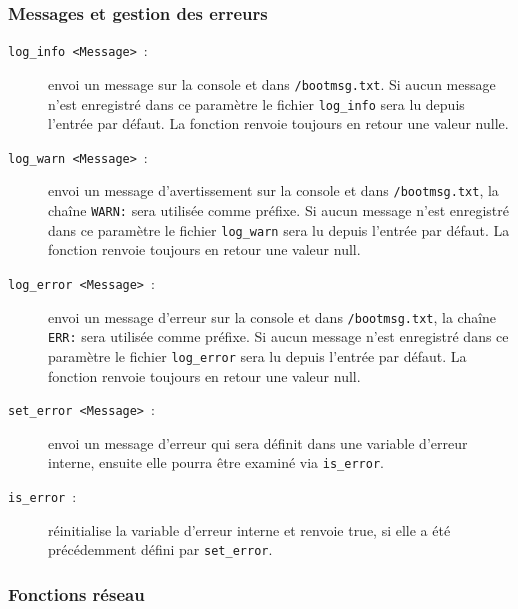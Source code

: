 \subsubsection{Messages et gestion des erreurs}

\begin{description}

\item[\texttt{log\_info <Message>}~:] envoi un message sur la console
et dans \texttt{/bootmsg.txt}. Si aucun message n'est enregistré dans ce paramètre
le fichier \texttt{log\_info} sera lu depuis l'entrée par défaut. La fonction renvoie
toujours en retour une valeur nulle.

\item[\texttt{log\_warn <Message>}~:] envoi un message d'avertissement sur la console
et dans \texttt{/bootmsg.txt}, la chaîne \texttt{WARN:} sera utilisée comme préfixe.
Si aucun message n'est enregistré dans ce paramètre le fichier \texttt{log\_warn}
sera lu depuis l'entrée par défaut. La fonction renvoie toujours en retour une valeur null.

\item[\texttt{log\_error <Message>}~:] envoi un message d'erreur sur la console
et dans \texttt{/bootmsg.txt}, la chaîne \texttt{ERR:} sera utilisée comme préfixe.
Si aucun message n'est enregistré dans ce paramètre le fichier \texttt{log\_error}
sera lu depuis l'entrée par défaut. La fonction renvoie toujours en retour une valeur null.

\item[\texttt{set\_error <Message>}~:] envoi un message d'erreur qui sera définit dans
  une variable d'erreur interne, ensuite elle pourra être examiné via \texttt{is\_error}.

\item[\texttt{is\_error}~:] réinitialise la variable d'erreur interne et renvoie true,
si elle a été précédemment défini par \texttt{set\_error}.

\end{description}


\subsubsection{Fonctions réseau}

